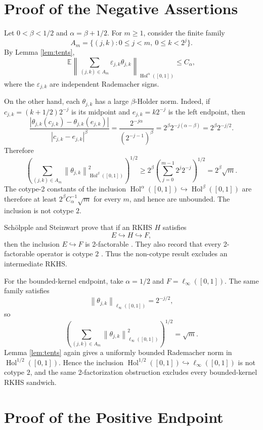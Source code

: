 \documentclass[11pt]{article}
\newcommand{\Hol}{\operatorname{Hol}}
\newcommand{\linf}{\ell_\infty}
\newcommand{\norm}[1]{\left\lVert #1\right\rVert}
\newcommand{\abs}[1]{\left\lvert #1\right\rvert}
\begin{document}
\section*{Proof of the Negative Assertions}

Let \(0<\beta<1/2\) and \(\alpha=\beta+1/2\). For \(m\ge1\), consider the
finite family
\[
  A_m=\{(j,k):0\le j<m,\ 0\le k<2^j\}.
\]
By Lemma \ref{lem:tents},
\[
  \mathbb{E}\left\|
  \sum_{(j,k)\in A_m}\varepsilon_{j,k}\theta_{j,k}
  \right\|_{\Hol^\alpha([0,1])}
  \le C_\alpha ,
\]
where the \(\varepsilon_{j,k}\) are independent Rademacher signs.

On the other hand, each \(\theta_{j,k}\) has a large \(\beta\)-Holder norm.
Indeed, if \(c_{j,k}=(k+1/2)2^{-j}\) is its midpoint and
\(e_{j,k}=k2^{-j}\) is the left endpoint, then
\[
  \frac{\abs{\theta_{j,k}(c_{j,k})-\theta_{j,k}(e_{j,k})}}
       {\abs{c_{j,k}-e_{j,k}}^\beta}
  =
  \frac{2^{-j\alpha}}{(2^{-j-1})^\beta}
  =
  2^\beta 2^{-j(\alpha-\beta)}
  =
  2^\beta 2^{-j/2}.
\]
Therefore
\[
  \left(\sum_{(j,k)\in A_m}
  \norm{\theta_{j,k}}_{\Hol^\beta([0,1])}^2\right)^{1/2}
  \ge
  2^\beta
  \left(\sum_{j=0}^{m-1}2^j2^{-j}\right)^{1/2}
  =
  2^\beta\sqrt m .
\]
The cotype-2 constants of the inclusion
\(\Hol^\alpha([0,1])\hookrightarrow\Hol^\beta([0,1])\) are therefore at least
\(2^\beta C_\alpha^{-1}\sqrt m\) for every \(m\), and hence are unbounded.
The inclusion is not cotype \(2\).

Sch\"olpple and Steinwart prove that if an RKHS \(H\) satisfies
\[
  E\hookrightarrow H\hookrightarrow F,
\]
then the inclusion \(E\hookrightarrow F\) is 2-factorable
\cite[Theorem 6]{SS}. They also record that every 2-factorable operator is
cotype \(2\) \cite[Lemma 5 and Corollary 8]{SS}. Thus the non-cotype result
excludes an intermediate RKHS.

For the bounded-kernel endpoint, take \(\alpha=1/2\) and \(F=\linf([0,1])\).
The same family satisfies
\[
  \norm{\theta_{j,k}}_{\linf([0,1])}=2^{-j/2},
\]
so
\[
  \left(\sum_{(j,k)\in A_m}
  \norm{\theta_{j,k}}_{\linf([0,1])}^2\right)^{1/2}
  =
  \sqrt m .
\]
Lemma \ref{lem:tents} again gives a uniformly bounded Rademacher norm in
\(\Hol^{1/2}([0,1])\). Hence the inclusion
\(\Hol^{1/2}([0,1])\hookrightarrow \linf([0,1])\) is not cotype \(2\), and the
same 2-factorization obstruction excludes every bounded-kernel RKHS sandwich.

\section*{Proof of the Positive Endpoint}
\end{document}
